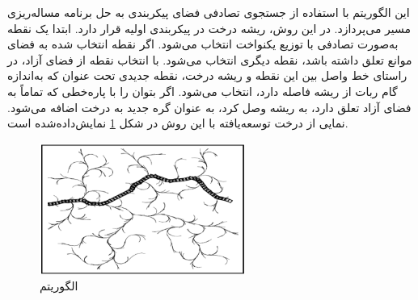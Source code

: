 این الگوریتم با استفاده از جستجوی تصادفی فضای پیکربندی به حل برنامه مساله‌ریزی مسیر می‌پردازد. در این روش، ریشه درخت در پیکربندی اولیه قرار دارد. ابتدا یک نقطه به‌صورت تصادفی با توزیع یکنواخت
\noindent\unskip{}
انتخاب می‌شود. اگر نقطه انتخاب شده به فضای موانع تعلق داشته باشد، نقطه دیگری انتخاب می‌شود. با انتخاب نقطه از فضای آزاد، در راستای خط واصل بین این نقطه و ریشه درخت، نقطه جدیدی تحت عنوان
که به‌اندازه گام ربات از ریشه فاصله دارد، انتخاب می‌شود.
اگر بتوان
را با پاره‌خطی که تماماً به فضای آزاد تعلق دارد، به ریشه وصل کرد،
به عنوان گره جدید به درخت اضافه می‌شود.
\newpage
نمایی از درخت توسعه‌یافته با این روش در شکل
\ref{RRT}
نمایش‌داده‌شده است.
\begin{figure}[h]
	\centering
	\includegraphics[width=0.6\textwidth]{./images/Chapter2/RRT}	
	\caption[الگوریتم ]{الگوریتم  \cite{irscholar20727638}}
	\label{RRT}
\end{figure}
\noindent
\unskip



